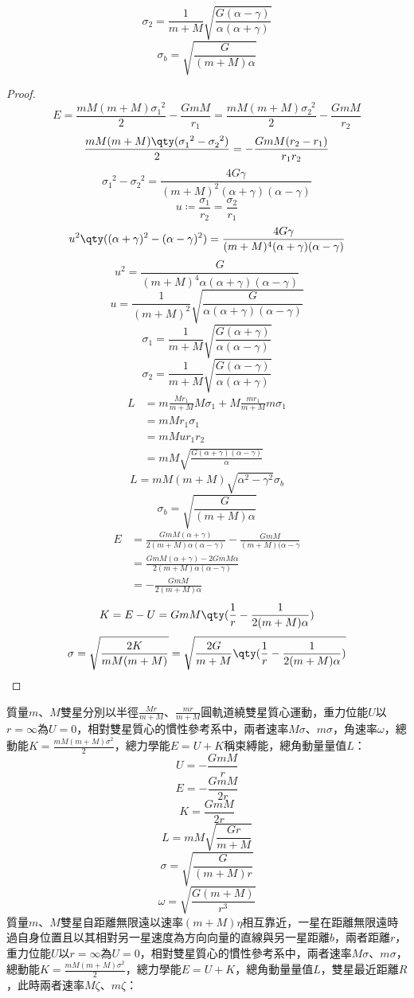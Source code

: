 \documentclass[a4paper,12pt]{article}
\begin{document}
\[\sigma_2=\frac{1}{m+M}\sqrt{\frac{G(\alpha-\gamma)}{\alpha(\alpha+\gamma)}}\]
\[\sigma_b=\sqrt{\frac{G}{(m+M)\alpha}}\]
\begin{proof}
\[E=\frac{mM(m+M)\sigma_1^{\phantom{1}2}}{2}-\frac{GmM}{r_1}=\frac{mM(m+M)\sigma_2^{\phantom{2}2}}{2}-\frac{GmM}{r_2}\]
\[\frac{mM(m+M)\qty(\sigma_1^{\phantom{1}2}-\sigma_2^{\phantom{2}2})}{2}=-\frac{GmM(r_2-r_1)}{r_1r_2}\]
\[\sigma_1^{\phantom{1}2}-\sigma_2^{\phantom{2}2}=\frac{4G\gamma}{(m+M)^2(\alpha+\gamma)(\alpha-\gamma)}\]
\[u\coloneq\frac{\sigma_1}{r_2}=\frac{\sigma_2}{r_1}\]
\[u^2\qty((\alpha+\gamma)^2-(\alpha-\gamma)^2)=\frac{4G\gamma}{(m+M)^4(\alpha+\gamma)(\alpha-\gamma)}\]
\[u^2=\frac{G}{(m+M)^4\alpha(\alpha+\gamma)(\alpha-\gamma)}\]
\[u=\frac{1}{(m+M)^2}\sqrt{\frac{G}{\alpha(\alpha+\gamma)(\alpha-\gamma)}}\]
\[\sigma_1=\frac{1}{m+M}\sqrt{\frac{G(\alpha+\gamma)}{\alpha(\alpha-\gamma)}}\]
\[\sigma_2=\frac{1}{m+M}\sqrt{\frac{G(\alpha-\gamma)}{\alpha(\alpha+\gamma)}}\]
\[\begin{aligned}
L&=m\frac{Mr_1}{m+M}M\sigma_1+M\frac{mr_1}{m+M}m\sigma_1\\
&=mMr_1\sigma_1\\
&=mMur_1r_2\\
&=mM\sqrt{\frac{G(\alpha+\gamma)(\alpha-\gamma)}{\alpha}}
\end{aligned}\]
\[L=mM(m+M)\sqrt{\alpha^2-\gamma^2}\sigma_b\]
\[\sigma_b=\sqrt{\frac{G}{(m+M)\alpha}}\]
\[\begin{aligned}
E&=\frac{GmM(\alpha+\gamma)}{2(m+M)\alpha(\alpha-\gamma)}-\frac{GmM}{(m+M)(\alpha-\gamma}\\
&=\frac{GmM(\alpha+\gamma)-2GmM\alpha}{2(m+M)\alpha(\alpha-\gamma)}\\
&=-\frac{GmM}{2(m+M)\alpha}
\end{aligned}\]
\[K=E-U=GmM\qty(\frac{1}{r}-\frac{1}{2(m+M)\alpha})\]
\[\sigma=\sqrt{\frac{2K}{mM(m+M)}}=\sqrt{\frac{2G}{m+M}\qty(\frac{1}{r}-\frac{1}{2(m+M)\alpha})}\]
\end{proof}
質量$m$、$M$雙星分別以半徑$\frac{Mr}{m+M}$、$\frac{mr}{m+M}$圓軌道繞雙星質心運動，重力位能$U$以$r=\infty$為$U=0$，相對雙星質心的慣性參考系中，兩者速率$M\sigma$、$m\sigma$，角速率$\omega$，總動能$K=\frac{mM(m+M)\sigma^2}{2}$，總力學能$E=U+K$稱束縛能，總角動量量值$L$：
\[U=-\frac{GmM}{r}\]
\[E=-\frac{GmM}{2r}\]
\[K=\frac{GmM}{2r}\]
\[L=mM\sqrt{\frac{Gr}{m+M}}\]
\[\sigma=\sqrt{\frac{G}{(m+M)r}}\]
\[\omega=\sqrt{\frac{G(m+M)}{r^3}}\]
質量$m$、$M$雙星自距離無限遠以速率$(m+M)\eta$相互靠近，一星在距離無限遠時過自身位置且以其相對另一星速度為方向向量的直線與另一星距離$b$，兩者距離$r$，重力位能$U$以$r=\infty$為$U=0$，相對雙星質心的慣性參考系中，兩者速率$M\sigma$、$m\sigma$，總動能$K=\frac{mM(m+M)\sigma^2}{2}$，總力學能$E=U+K$，總角動量量值$L$，雙星最近距離$R$，此時兩者速率$M\zeta$、$m\zeta$：
\end{document}
